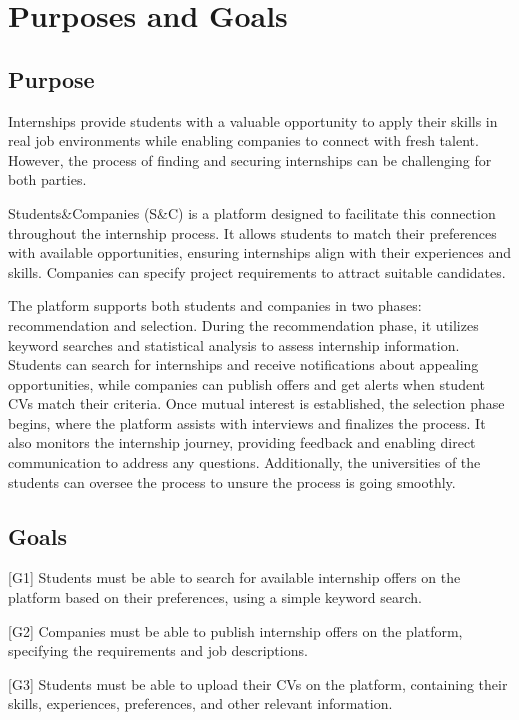 
\renewcommand{\thesection}{\Alph{section}}
\section{Purposes and Goals}
\label{sec:purposeandgoals}
\subsection{Purpose}
\label{sec:purpose}
Internships provide students with a valuable opportunity to apply their skills in real job environments while enabling companies to connect with 
fresh talent. However, the process of finding and securing internships can be challenging for both parties.

Students\&Companies (S\&C) is a platform designed to facilitate this connection throughout the internship process. It allows 
students to match their preferences with available opportunities, ensuring internships align with their experiences and skills. 
Companies can specify project requirements to attract suitable candidates.

The platform supports both students and companies in two phases: recommendation and selection. During the recommendation phase, 
it utilizes keyword searches and statistical analysis to assess internship information. Students can search for internships and receive 
notifications about appealing opportunities, while companies can publish offers and get alerts when student CVs match their criteria.
Once mutual interest is established, the selection phase begins, where the platform assists with interviews and finalizes the process. 
It also monitors the internship journey, providing feedback and enabling direct communication to address any questions. Additionally, 
the universities of the students can oversee the process to unsure the process is going smoothly.

\subsection{Goals}
\label{sec:goals}
[G1] Students must be able to search for available internship offers on the platform based on their preferences, using a simple keyword search.

[G2] Companies must be able to publish internship offers on the platform, specifying the requirements and job descriptions.

[G3] Students must be able to upload their CVs on the platform, containing their skills, experiences, preferences, and other relevant information.

